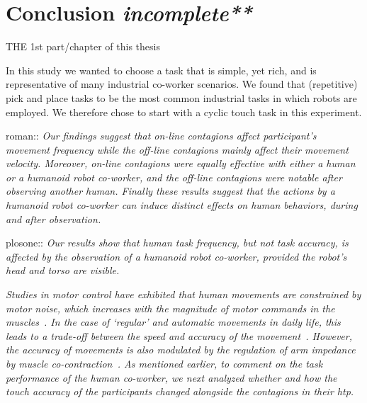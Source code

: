 
{\color{blue}\chapter*{Conclusion \textit{incomplete**}}}
\pagestyle{plain}

THE 1st part/chapter of this thesis


In this study we wanted to choose a task that is simple, yet rich, and is representative of many industrial co-worker scenarios. We found that (repetitive) pick and place tasks to be the most common industrial tasks in which robots are employed. We therefore chose to start with a cyclic touch task in this experiment.

roman::\textit{ Our findings suggest that on-line contagions affect participant's movement frequency while the \textit{off-line} contagions mainly affect their movement velocity. Moreover, on-line contagions were equally effective with either a human or a humanoid robot co-worker, and the \textit{off-line} contagions were notable after observing another human. Finally these results suggest that the actions by a humanoid robot co-worker can induce distinct effects on human behaviors, during and after observation.}


plosone:: \textit{Our results show that human task frequency, but not task accuracy, is affected by the observation of a humanoid robot co-worker, provided the robot's head and torso are visible.
}




\textit{Studies in motor control have exhibited that human movements are constrained by motor noise, which increases with the magnitude of motor commands in the muscles~\cite{Harris:Nature:1998}. In the case of `regular' and automatic movements in daily life, this leads to a trade-off between the speed and accuracy of the movement~\cite{Fitts:JEP:1954}. However, the accuracy of movements is also modulated by the regulation of arm impedance by muscle co-contraction~\cite{Burdet:nature:2001, Franklin:JoN:2008, Ganesh:RAS:2013}. As mentioned earlier, to comment on the task performance of the human co-worker, we next analyzed whether and how the touch accuracy of the participants changed alongside the contagions in their {\it htp}. 
}

